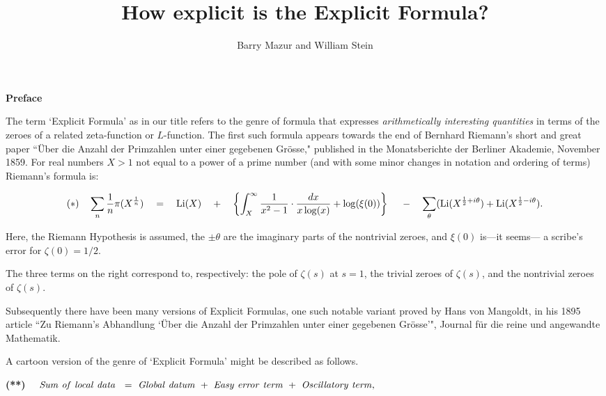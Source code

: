 \documentclass[11pt]{article}
\title{How explicit is the Explicit Formula?}
\author{Barry Mazur and William Stein}
\theoremstyle{plain}
\theoremstyle{definition}
\numberwithin{equation}{section}
\numberwithin{figure}{section}
\numberwithin{table}{section}
\begin{document}
\maketitle


\vskip10pt
\centerline{\bf Preface}
\vskip10pt

The  term `Explicit Formula' as in our title refers to the genre of formula that expresses {\it arithmetically interesting quantities} in terms of the zeroes of  a related zeta-function or $L$-function.  The first such formula appears towards the end of Bernhard Riemann's short and great paper  ``\"{U}ber die Anzahl der Primzahlen unter einer
gegebenen Gr\"{o}sse," published in the
Monatsberichte der Berliner Akademie,
November 1859.  For real numbers $X>1$ not equal to a power of a prime number  (and with some minor changes in notation and ordering  of terms) Riemann's formula is:

$${\bf (*)}\ \ \ \sum_{n} {\frac{1}{n}}\pi(X^{{\frac{1}{n}}}) \ \ \    = \ \ \    {\rm Li}(X) \ \ \   + \ \ \  \left\{ \int_X^{\infty}{\frac{1}{x^2-1}}\cdot {\frac{dx}{x\log(x)}} +\log(\xi(0))\right\}\ \ \ \     - \ \ \   \sum_\theta({\rm Li}(X^{{\frac{1}{2}}+i\theta})+ {\rm Li}(X^{{\frac{1}{2}}-i\theta}).$$

Here,  the Riemann Hypothesis is assumed, the $\pm \theta$ are the imaginary parts of the nontrivial zeroes, and  $\xi(0)$ is---it seems--- a scribe's error for  $\zeta(0)=1/2$.

The three terms on the right correspond to, respectively:  the pole of $\zeta(s)$ at $s=1$, the trivial zeroes of $\zeta(s)$, and the nontrivial zeroes of $\zeta(s)$.


 Subsequently there have been many versions of Explicit Formulas, one such notable variant  proved by Hans von  Mangoldt, in his 1895 article  ``Zu Riemann's Abhandlung `\"{U}ber die Anzahl der Primzahlen unter einer gegebenen Gr\"{o}sse'", Journal f\"{u}r die reine und angewandte Mathematik.

 A  cartoon version of the genre of `Explicit Formula' might be described as follows.

 {{\bf (**)} \ \  ${\rm{\it Sum\ of\ local\ data\  }}  \ = \  {\rm{\it Global\ datum}}\ +\  {\rm{\it  Easy\ error\ term}}\ +\  {\rm{\it  Oscillatory\ term}},$ }
\end{document}
